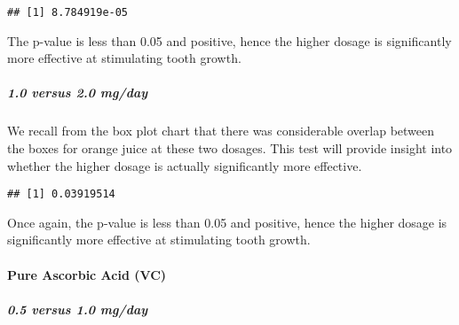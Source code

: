 \documentclass[]{article}
\newenvironment{Shaded}{\begin{snugshade}}{\end{snugshade}}
\newcommand{\KeywordTok}[1]{\textcolor[rgb]{0.13,0.29,0.53}{\textbf{#1}}}
\newcommand{\FloatTok}[1]{\textcolor[rgb]{0.00,0.00,0.81}{#1}}
\newcommand{\StringTok}[1]{\textcolor[rgb]{0.31,0.60,0.02}{#1}}
\newcommand{\OperatorTok}[1]{\textcolor[rgb]{0.81,0.36,0.00}{\textbf{#1}}}
\newcommand{\NormalTok}[1]{#1}
\let\oldparagraph\paragraph
\renewcommand{\paragraph}[1]{\oldparagraph{#1}\mbox{}}
\let\oldsubparagraph\subparagraph
\renewcommand{\subparagraph}[1]{\oldsubparagraph{#1}\mbox{}}
\begin{document}
\begin{verbatim}
## [1] 8.784919e-05
\end{verbatim}

The p-value is less than 0.05 and positive, hence the higher dosage is
significantly more effective at stimulating tooth growth.

\subparagraph{1.0 versus 2.0 mg/day}\label{versus-2.0-mgday}

We recall from the box plot chart that there was considerable overlap
between the boxes for orange juice at these two dosages. This test will
provide insight into whether the higher dosage is actually significantly
more effective.

\begin{Shaded}
\end{Shaded}

\begin{verbatim}
## [1] 0.03919514
\end{verbatim}

Once again, the p-value is less than 0.05 and positive, hence the higher
dosage is significantly more effective at stimulating tooth growth.

\paragraph{Pure Ascorbic Acid (VC)}\label{pure-ascorbic-acid-vc}

\subparagraph{0.5 versus 1.0 mg/day}\label{versus-1.0-mgday-1}

\begin{Shaded}
\end{Shaded}
\end{document}
